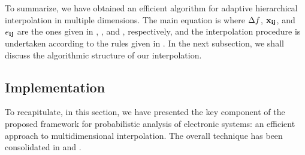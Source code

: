 To summarize, we have obtained an efficient algorithm for adaptive hierarchical
interpolation in multiple dimensions. The main equation is 
where $\Delta f$, $\mathbf{x}_{\mathbf{i}\mathbf{j}}$, and $e_{\mathbf{i}\mathbf{j}}$ are the ones given in
, , and , respectively, and the
interpolation procedure is undertaken according to the rules given in
. In the next subsection, we shall discuss the algorithmic
structure of our interpolation.

\subsection{Implementation} 


To recapitulate, in this section, we have presented the key component of the
proposed framework for probabilistic analysis of electronic systems: an
efficient approach to multidimensional interpolation. The overall technique has
been consolidated in  and .
